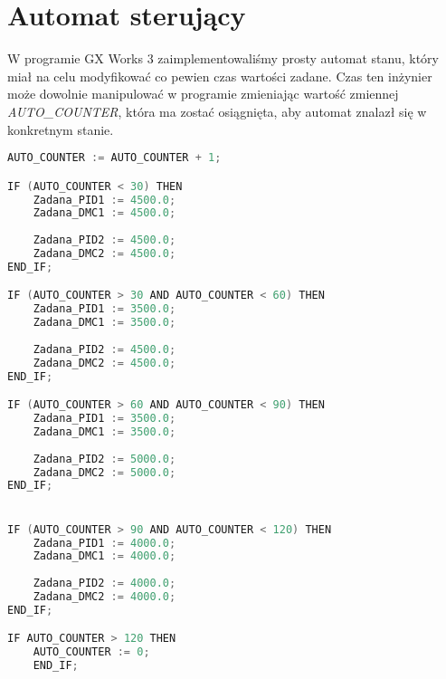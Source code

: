 \chapter{Automat sterujący}
\label{thermal_automat}
W programie GX Works 3 zaimplementowaliśmy prosty automat stanu, który miał na celu modyfikować co pewien czas wartości zadane. Czas ten inżynier może dowolnie manipulować w programie zmieniając wartość zmiennej \textit{AUTO\_COUNTER}, która ma zostać osiągnięta, aby automat znalazł się w konkretnym stanie.

\begin{lstlisting}[caption={Implementacja automatu sterującego w programie GX Works 3}, language=C]
AUTO_COUNTER := AUTO_COUNTER + 1;

IF (AUTO_COUNTER < 30) THEN
	Zadana_PID1 := 4500.0;
	Zadana_DMC1 := 4500.0;
	
	Zadana_PID2 := 4500.0;
	Zadana_DMC2 := 4500.0;
END_IF;

IF (AUTO_COUNTER > 30 AND AUTO_COUNTER < 60) THEN
	Zadana_PID1 := 3500.0;
	Zadana_DMC1 := 3500.0;
	
	Zadana_PID2 := 4500.0;
	Zadana_DMC2 := 4500.0;
END_IF;

IF (AUTO_COUNTER > 60 AND AUTO_COUNTER < 90) THEN
	Zadana_PID1 := 3500.0;
	Zadana_DMC1 := 3500.0;
	
	Zadana_PID2 := 5000.0;
	Zadana_DMC2 := 5000.0;
END_IF;


IF (AUTO_COUNTER > 90 AND AUTO_COUNTER < 120) THEN
	Zadana_PID1 := 4000.0;
	Zadana_DMC1 := 4000.0;
	
	Zadana_PID2 := 4000.0;
	Zadana_DMC2 := 4000.0;
END_IF;

IF AUTO_COUNTER > 120 THEN
	AUTO_COUNTER := 0;
	END_IF;
\end{lstlisting}

